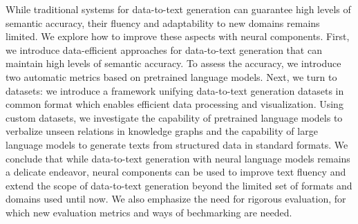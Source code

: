 While traditional systems for data-to-text generation can guarantee high levels of semantic accuracy, their fluency and adaptability to new domains remains limited. We explore how to improve these aspects with neural components.
First, we introduce data-efficient approaches for data-to-text generation that can maintain high levels of semantic accuracy. To assess the accuracy, we introduce two automatic metrics based on pretrained language models. Next, we turn to datasets: we introduce a framework unifying data-to-text generation datasets in common format which enables efficient data processing and visualization. Using custom datasets, we investigate the capability of pretrained language models to verbalize unseen relations in knowledge graphs and the capability of large language models to generate texts from structured data in standard formats. We conclude that while data-to-text generation with neural language models remains a delicate endeavor, neural components can be used to improve text fluency and extend the scope of data-to-text generation beyond the limited set of formats and domains used until now. We also emphasize the need for rigorous evaluation, for which new evaluation metrics and ways of bechmarking are needed.
